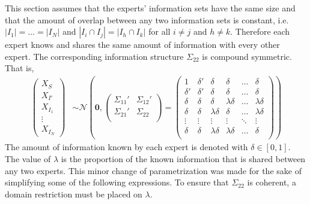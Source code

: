 \documentclass[11pt]{article}
\theoremstyle{definition}
\theoremstyle{definition}
\begin{document}
This section assumes that the experts' information sets have the same size and that the amount of overlap between any two information sets is constant, i.e.  $|I_{1}| =  \dots = |I_{N}|$ and $|I_{i} \cap I_{j}| = |I_{h} \cap I_{k}|$ for all $i \neq j$ and $h \neq k$. Therefore each expert knows and shares the same amount of information with every other expert. The corresponding information structure $\Sigma_{22}$ is compound symmetric. That is,
\begin{align*}
\left(\begin{matrix} X_{S} \\ X_{I'}\\ X_{I_1}\\ \vdots \\ X_{I_N} \end{matrix}\right) &\sim \mathcal{N}\left( 
 \boldsymbol{0}, \left(\begin{matrix} 
\Sigma_{11}' & \Sigma_{12}'\\
\Sigma_{21}' & \Sigma_{22}\\
 \end{matrix}\right) 
 =
 \left(\begin{array}{cc|cccc}
1 & \delta'& \delta & \delta & \dots & \delta  \\ 
\delta' & \delta' & \delta & \delta & \dots & \delta  \\ \hline
\delta & \delta &\delta & \lambda\delta & \dots & \lambda\delta   \\ 
\delta& \delta & \lambda\delta & \delta & \dots & \lambda\delta  \\ 
\vdots &\vdots & \vdots & \vdots & \ddots & \vdots  \\ 
\delta &\delta & \lambda\delta & \lambda\delta & \dots & \delta\\ 
 \end{array}\right)\right)
\end{align*}
The amount of information known by each expert is denoted with $\delta \in [0,1]$. The value of $\lambda$ is the proportion of the known information that is shared between any two experts.  This minor change of parametrization was made for the sake of simplifying some of the following expressions. To ensure that $\Sigma_{22}$ is coherent, a domain restriction must be placed on $\lambda$. 
\end{document}
